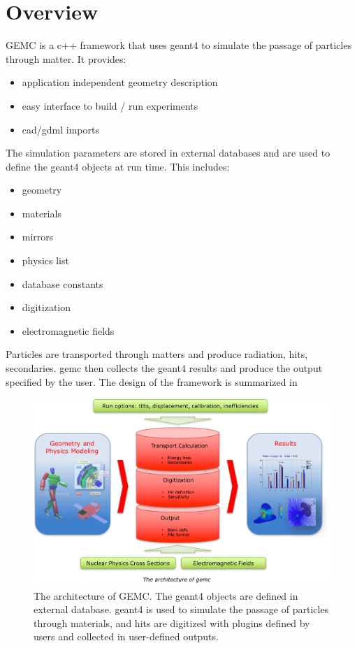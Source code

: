 \section{Overview}

GEMC \cite{gemc} is a c++ framework that uses geant4 \cite{geant4} to simulate the passage of particles through matter. It provides:
\begin{itemize}
	\item application independent geometry description
	\item easy interface to build / run experiments
	\item cad/gdml imports
\end{itemize}

The simulation parameters are stored in external databases and are used to define the geant4 objects at run time. This includes:
\begin{itemize}
	\item geometry
	\item materials
	\item mirrors
	\item physics list
	\item database constants
	\item digitization
	\item electromagnetic fields
\end{itemize}

Particles are transported through matters and produce radiation, hits, secondaries.
gemc then collects the geant4 results and produce the output specified by the user.
The design of the framework is summarized in 

\begin{figure}
	\centering
	\includegraphics[width=0.98\columnwidth,keepaspectratio]{img/gemcDesign.png}
	\caption{The architecture of GEMC. The geant4 objects are defined in external database. geant4 is used to simulate the
             passage of particles through materials, and hits are digitized with plugins defined by users
             and collected in user-defined outputs. }
	\label{fig:gemcDesign}
\end{figure}


